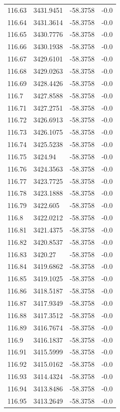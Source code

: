 \begin{table}[H]
\begin{tabular}{llll}
116.63 & 3431.9451 & -58.3758 & -0.0 \\
116.64 & 3431.3614 & -58.3758 & -0.0 \\
116.65 & 3430.7776 & -58.3758 & -0.0 \\
116.66 & 3430.1938 & -58.3758 & -0.0 \\
116.67 & 3429.6101 & -58.3758 & -0.0 \\
116.68 & 3429.0263 & -58.3758 & -0.0 \\
116.69 & 3428.4426 & -58.3758 & -0.0 \\
116.7 & 3427.8588 & -58.3758 & -0.0 \\
116.71 & 3427.2751 & -58.3758 & -0.0 \\
116.72 & 3426.6913 & -58.3758 & -0.0 \\
116.73 & 3426.1075 & -58.3758 & -0.0 \\
116.74 & 3425.5238 & -58.3758 & -0.0 \\
116.75 & 3424.94 & -58.3758 & -0.0 \\
116.76 & 3424.3563 & -58.3758 & -0.0 \\
116.77 & 3423.7725 & -58.3758 & -0.0 \\
116.78 & 3423.1888 & -58.3758 & -0.0 \\
116.79 & 3422.605 & -58.3758 & -0.0 \\
116.8 & 3422.0212 & -58.3758 & -0.0 \\
116.81 & 3421.4375 & -58.3758 & -0.0 \\
116.82 & 3420.8537 & -58.3758 & -0.0 \\
116.83 & 3420.27 & -58.3758 & -0.0 \\
116.84 & 3419.6862 & -58.3758 & -0.0 \\
116.85 & 3419.1025 & -58.3758 & -0.0 \\
116.86 & 3418.5187 & -58.3758 & -0.0 \\
116.87 & 3417.9349 & -58.3758 & -0.0 \\
116.88 & 3417.3512 & -58.3758 & -0.0 \\
116.89 & 3416.7674 & -58.3758 & -0.0 \\
116.9 & 3416.1837 & -58.3758 & -0.0 \\
116.91 & 3415.5999 & -58.3758 & -0.0 \\
116.92 & 3415.0162 & -58.3758 & -0.0 \\
116.93 & 3414.4324 & -58.3758 & -0.0 \\
116.94 & 3413.8486 & -58.3758 & -0.0 \\
116.95 & 3413.2649 & -58.3758 & -0.0 \\

\end{tabular}
\end{table}
